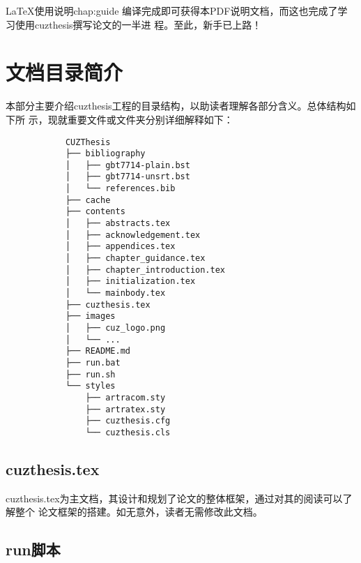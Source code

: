 \begin{cuzchapter}{\LaTeX{}使用说明}{chap:guide}
    编译完成即可获得本PDF说明文档，而这也完成了学习使用cuzthesis撰写论文的一半进
    程。至此，新手已上路！

    \section{文档目录简介}\label{sec:directory}

    本部分主要介绍cuzthesis工程的目录结构，以助读者理解各部分含义。总体结构如下所
    示，现就重要文件或文件夹分别详细解释如下：

    \begingroup
    \small\linespread{1}
    \begin{center}
        \begin{verbatim}
            CUZThesis
            ├── bibliography
            │   ├── gbt7714-plain.bst
            │   ├── gbt7714-unsrt.bst
            │   └── references.bib
            ├── cache
            ├── contents
            │   ├── abstracts.tex
            │   ├── acknowledgement.tex
            │   ├── appendices.tex
            │   ├── chapter_guidance.tex
            │   ├── chapter_introduction.tex
            │   ├── initialization.tex
            │   └── mainbody.tex
            ├── cuzthesis.tex
            ├── images
            │   ├── cuz_logo.png
            │   └── ...
            ├── README.md
            ├── run.bat
            ├── run.sh
            └── styles
                ├── artracom.sty
                ├── artratex.sty
                ├── cuzthesis.cfg
                └── cuzthesis.cls
        \end{verbatim}
    \end{center}
    \endgroup

    \subsection{cuzthesis.tex}\label{sub:cuzthesis}

    cuzthesis.tex为主文档，其设计和规划了论文的整体框架，通过对其的阅读可以了解整个
    论文框架的搭建。如无意外，读者无需修改此文档。

    \subsection{run脚本}\label{sub:scripts}


\end{cuzchapter}

